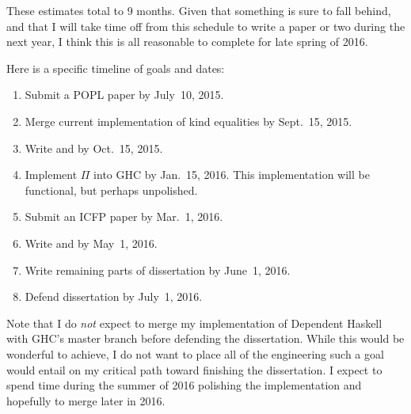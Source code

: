 \begin{proposal}
These estimates total to 9 months. Given that something is sure to fall behind,
and that I will take time off from this schedule to write a paper or two during
the next year, I think this is all reasonable to complete for late spring of 2016.

Here is a specific timeline of goals and dates:
\begin{enumerate}
\item Submit a POPL paper by July~10, 2015.
\item Merge current implementation of kind equalities by Sept.~15, 2015.
\item Write  and  by Oct.~15, 2015.
\item Implement $\Pi$ into GHC by Jan.~15, 2016. This implementation will
be functional, but perhaps unpolished.
\item Submit an ICFP paper by Mar.~1, 2016.
\item Write  and  by May~1, 2016.
\item Write remaining parts of dissertation by June~1, 2016.
\item Defend dissertation by July~1, 2016.
\end{enumerate}

Note that I do \emph{not} expect to merge my implementation of Dependent
Haskell with GHC's master branch before defending the dissertation. While this
would be wonderful to achieve, I do not want to place all of the engineering
such a goal would entail on my critical path toward finishing the
dissertation. I expect to spend time during the summer of 2016 polishing the
implementation and hopefully to merge later in 2016.

\end{proposal}

